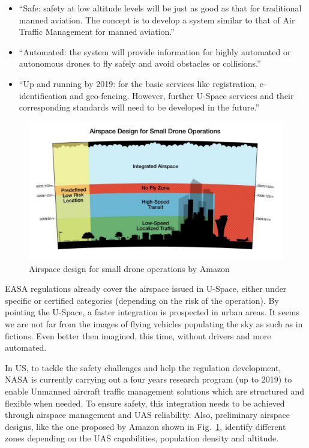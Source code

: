 \begin{itemize}
\item{``Safe: safety at low altitude levels will be just as good as that for traditional manned aviation. The concept is to develop a system similar to that of Air Traffic Management for manned aviation.''}
\item{``Automated: the system will provide information for highly automated or autonomous drones to fly safely and avoid obstacles or collisions.''}
\item{``Up and running by 2019: for the basic services like registration, e-identification and geo-fencing. However, further U-Space services and their corresponding standards will need to be developed in the future.''}
\end{itemize}


\begin{figure}
\begin{center}
\includegraphics[width=17cm]{figures/amazonDroneOperations}    %
\caption{Airspace design for small drone operations by Amazon \cite{amazonAirspace}} 
\label{fig:amazonDroneOperations}
\end{center}
\end{figure}

EASA regulations already cover the airspace issued in U-Space, either under specific or certified categories (depending on the risk of the operation). 
By pointing the U-Space, a faster integration is prospected in urban areas.
It seems we are not far from the images of flying vehicles populating the sky as such as in fictions. 
Even better then imagined, this time, without drivers and more automated. 

In US, to tackle the safety challenges and help the regulation development, NASA is currently carrying out a four years research program (up to 2019) to enable Unmanned aircraft traffic management solutions which are structured and flexible when needed. 
To ensure safety, this integration needs to be achieved through airspace management and UAS reliability.
Also, preliminary airspace designs, like the one proposed by Amazon shown in Fig.~\ref{fig:amazonDroneOperations}, identify different zones depending on the UAS capabilities, population density and altitude. 


